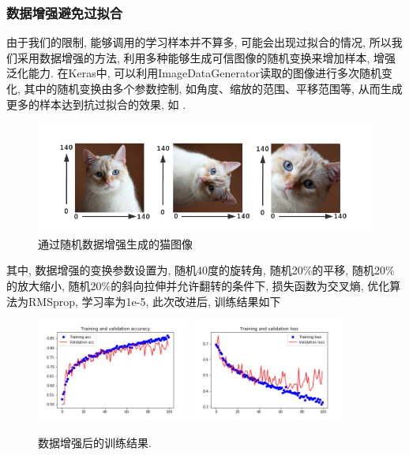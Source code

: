 \documentclass[lang=cn,11pt]{elegantpaper}
\begin{document}
\subsubsection{数据增强避免过拟合}
由于我们的限制, 能够调用的学习样本并不算多, 可能会出现过拟合的情况, 所以我们采用数据增强的方法, 利用多种能够生成可信图像的随机变换来增加样本, 增强泛化能力.  在Keras中, 可以利用ImageDataGenerator读取的图像进行多次随机变化, 其中的随机变换由多个参数控制, 如角度、缩放的范围、平移范围等, 从而生成更多的样本达到抗过拟合的效果, 如 .
\begin{figure}[htbp]
\centering
  \includegraphics{aug.png}
  \caption{通过随机数据增强生成的猫图像\label{fig:augcat}}
\end{figure}

其中, 数据增强的变换参数设置为, 随机40度的旋转角, 随机20\%的平移, 随机20\%的放大缩小, 随机20\%的斜向拉伸并允许翻转的条件下, 损失函数为交叉熵, 优化算法为RMSprop, 学习率为1e-5, 此次改进后, 训练结果如下
\begin{figure}[hbt]
\centering
  \includegraphics[width=0.45\textwidth]{small_aug_1.png}
  \includegraphics[width=0.45\textwidth]{small_aug_2.png}
  \caption{数据增强后的训练结果.}
\end{figure}
\end{document}
